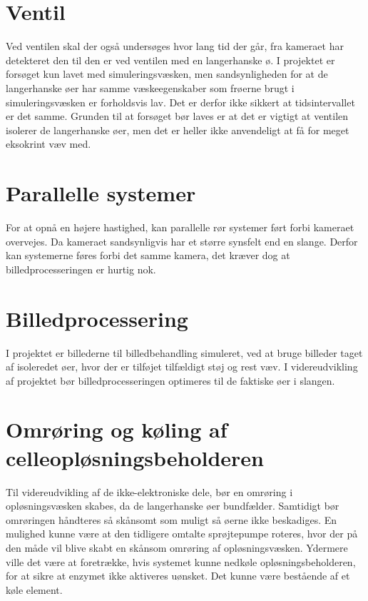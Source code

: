 \section{Ventil}
Ved ventilen skal der også undersøges hvor lang tid der går, fra kameraet har detekteret den til den er ved ventilen med en langerhanske ø. I projektet er forsøget kun lavet med simuleringsvæsken, men sandsynligheden for at de langerhanske øer har samme væskeegenskaber som frøerne brugt i simuleringsvæsken er forholdsvis lav. Det er derfor ikke sikkert at tidsintervallet er det samme. Grunden til at forsøget bør laves er at det er vigtigt at ventilen isolerer de langerhanske øer, men det er heller ikke anvendeligt at få for meget eksokrint væv med.

\section{Parallelle systemer}
For at opnå en højere hastighed, kan parallelle rør systemer ført forbi kameraet overvejes.
Da kameraet sandsynligvis har et større synsfelt end en slange. Derfor kan systemerne føres forbi det samme kamera, det kræver dog at billedprocesseringen er hurtig nok.

\section{Billedprocessering}
I projektet er billederne til billedbehandling simuleret, ved at bruge billeder taget af isoleredet øer, hvor der er tilføjet tilfældigt støj og rest væv. I videreudvikling af projektet bør billedprocesseringen optimeres til de faktiske øer i slangen.

\section{Omrøring og køling af celleopløsningsbeholderen}
Til videreudvikling af de ikke-elektroniske dele, bør en omrøring i opløsningsvæsken skabes, da de langerhanske øer bundfælder. Samtidigt bør omrøringen håndteres så skånsomt som muligt så øerne ikke beskadiges. En mulighed kunne være at den tidligere omtalte sprøjtepumpe roteres, hvor der på den måde vil blive skabt en skånsom omrøring af opløsningsvæsken. Ydermere ville det være at foretrække, hvis systemet kunne nedkøle opløsningsbeholderen, for at sikre at enzymet ikke aktiveres uønsket. Det kunne være bestående af et køle element. 

